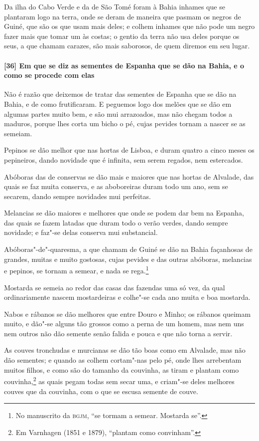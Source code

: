 Da ilha do Cabo Verde e da de São Tomé foram à Bahia inhames que se plantaram logo na
terra, onde se deram de maneira que pasmam os negros de Guiné, que são os que usam mais
deles; e colhem inhames que não pode um negro fazer mais que tomar um às costas; o gentio
da terra não usa deles porque os seus, a que chamam carazes, são mais saborosos, de quem
diremos em seu lugar.

\paragraph{[36] Em que se diz as sementes de Espanha que se dão na Bahia, e o como se
procede com elas}\quad
Não é razão que deixemos de tratar das sementes de Espanha que se dão na Bahia, e de como
frutificaram. E peguemos logo dos melões que se dão em algumas partes muito bem, e são mui
arrazoados, mas não chegam todos a maduros, porque lhes corta um bicho o pé, cujas pevides
tornam a nascer se as semeiam.

Pepinos se dão melhor que nas hortas de Lisboa, e duram quatro a cinco meses os
pepineiros, dando novidade que é infinita, sem serem regados, nem estercados.

Abóboras das de conservas se dão mais e maiores que nas hortas de Alvalade, das quais se
faz muita conserva, e as aboboreiras duram todo um ano, sem se secarem, dando sempre
novidades mui perfeitas.

Melancias se dão maiores e melhores que onde se podem dar bem na Espanha, das quais se
fazem latadas que duram todo o verão verdes, dando sempre novidade; e faz"-se delas
conserva mui substancial.

Abóboras"-de"-quaresma, a que chamam de Guiné se dão na Bahia façanhosas de grandes, muitas
e muito gostosas, cujas pevides e das outras abóboras, melancias e pepinos, se tornam a
semear, e nada se rega.\footnote{ No manuscrito da \textsc{bgjm}, ``se tormam a semear.
Mostarda se''.}

Mostarda se semeia ao redor das casas das fazendas uma só vez, da qual ordinariamente
nascem mostardeiras e colhe"-se cada ano muita e boa mostarda.

Nabos e rábanos se dão melhores que entre Douro e Minho; os rábanos queimam muito, e
dão"-se alguns tão grossos como a perna de um homem, mas nem uns nem outros não dão semente
senão falida e pouca e que não torna a servir.

As couves tronchudas e murcianas se dão tão boas como em Alvalade, mas não dão sementes; e
quando as colhem cortam"-nas pelo pé, onde lhes arrebentam muitos filhos, e como são do
tamanho da couvinha, as tiram e plantam como couvinha,\footnote{ Em Varnhagen (1851 e
1879), ``plantam como convinham''.} as quais pegam todas sem secar uma, e criam"-se deles
melhores couves que da couvinha, com o que se escusa semente de couve.

